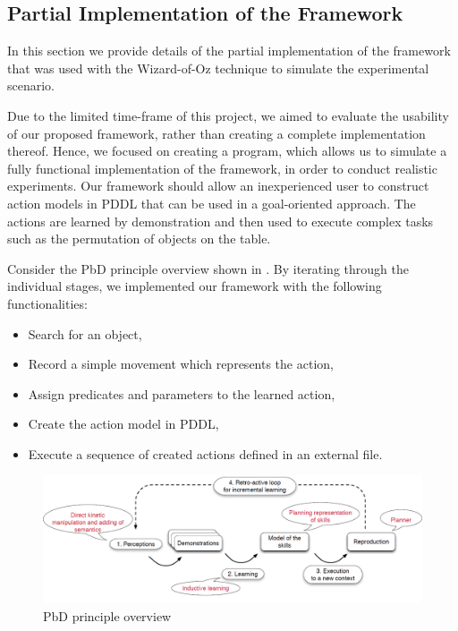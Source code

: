 
\subsection{Partial Implementation of the Framework}\label{ssec:WoZ}
In this section we provide details of the partial implementation of the framework that was used with the Wizard-of-Oz technique to simulate the experimental scenario.

Due to the limited time-frame of this project, we aimed to evaluate the usability of our proposed framework, rather than creating a complete implementation thereof.
Hence, we focused on creating a program, which allows us to simulate a fully functional implementation of the framework, in order to conduct realistic experiments.
Our framework should allow an inexperienced user to construct action models in PDDL that can be used in a goal-oriented approach.
The actions are learned by demonstration and then used to execute complex tasks such as the permutation of objects on the table.

Consider the PbD principle overview shown in .
By iterating through the individual stages, we implemented our framework with the following functionalities:
\begin{itemize}
\item Search for an object,
\item Record a simple movement which represents the action,
\item Assign predicates and parameters to the learned action,
\item Create the action model in PDDL,
\item Execute a sequence of created actions defined in an external file.
\end{itemize}

  \begin{figure}[ht]
    \centering
    \includegraphics[scale=0.45]{figures/Baxter-Case-Study}
    \caption{PbD principle overview}
    \label{fig:Baxter-Case-Study}
  \end{figure}

